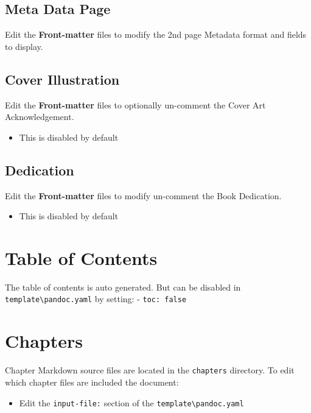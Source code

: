 \documentclass[
  12pt,
  openany]{book}
\providecommand{\tightlist}{%
  \setlength{\itemsep}{0pt}\setlength{\parskip}{0pt}}
\begin{document}
\subsection{Meta Data Page}\label{meta-data-page}

Edit the \textbf{Front-matter} files to modify the 2nd page Metadata
format and fields to display.

\subsection{Cover Illustration}\label{cover-illustration}

Edit the \textbf{Front-matter} files to optionally un-comment the Cover
Art Acknowledgement.

\begin{itemize}
\tightlist
\item
  This is disabled by default
\end{itemize}

\subsection{Dedication}\label{dedication}

Edit the \textbf{Front-matter} files to modify un-comment the Book
Dedication.

\begin{itemize}
\tightlist
\item
  This is disabled by default
\end{itemize}

\section{Table of Contents}\label{table-of-contents}

The table of contents is auto generated. But can be disabled in
\texttt{template\textbackslash{}pandoc.yaml} by setting: -
\texttt{toc:\ false}

\section{Chapters}\label{chapters}

Chapter Markdown source files are located in the \texttt{chapters}
directory. To edit which chapter files are included the document:

\begin{itemize}
\tightlist
\item
  Edit the \texttt{input-file:} section of the
  \texttt{template\textbackslash{}pandoc.yaml}
\end{itemize}
\end{document}
